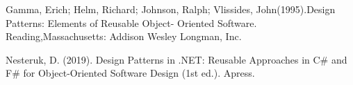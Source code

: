 \documentclass[twoside,twocolumn]{article}
\begin{document}

\begin{thebibliography}{99} 

\bibitem[1]{}
\newblock Gamma, Erich; Helm, Richard; Johnson, Ralph; Vlissides, John(1995).Design Patterns: Elements of Reusable Object- Oriented Software. Reading,Massachusetts: Addison Wesley Longman, Inc.

\bibitem[2]{}
\newblock Nesteruk, D. (2019). Design Patterns in .NET: Reusable Approaches in C# and F# for Object-Oriented Software Design (1st ed.). Apress.



\end{thebibliography}


\end{document}
